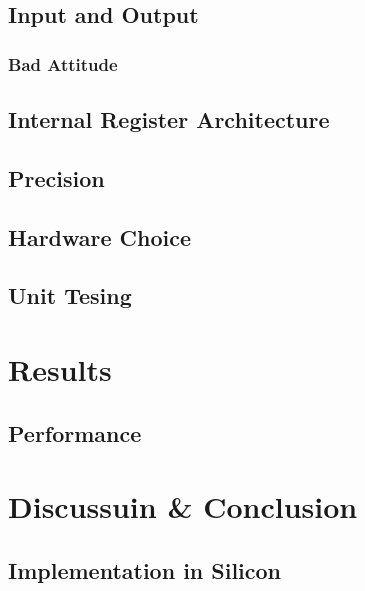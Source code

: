 \documentclass{report}
\begin{document}
        \section {Input and Output}
    
            \subsection {Bad Attitude}
    
        \section {Internal Register Architecture}
    
        \section{Precision}
    
        \section{Hardware Choice}
    
        \section{Unit Tesing}
    
    \chapter{Results}
    
        \section {Performance}
    
    \chapter{Discussuin \& Conclusion}
    
        \section{Implementation in Silicon}
\end{document}
